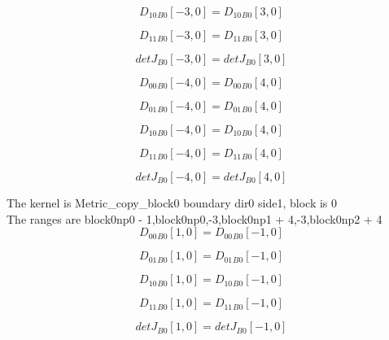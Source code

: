 \documentclass{article}
\begin{document}
\begin{dmath}{D_{10}{_{B0}}}[{-3,0}] = {D_{10}{_{B0}}}[{3,0}]\end{dmath}

\begin{dmath}{D_{11}{_{B0}}}[{-3,0}] = {D_{11}{_{B0}}}[{3,0}]\end{dmath}

\begin{dmath}{detJ{_{B0}}}[{-3,0}] = {detJ{_{B0}}}[{3,0}]\end{dmath}

\begin{dmath}{D_{00}{_{B0}}}[{-4,0}] = {D_{00}{_{B0}}}[{4,0}]\end{dmath}

\begin{dmath}{D_{01}{_{B0}}}[{-4,0}] = {D_{01}{_{B0}}}[{4,0}]\end{dmath}

\begin{dmath}{D_{10}{_{B0}}}[{-4,0}] = {D_{10}{_{B0}}}[{4,0}]\end{dmath}

\begin{dmath}{D_{11}{_{B0}}}[{-4,0}] = {D_{11}{_{B0}}}[{4,0}]\end{dmath}

\begin{dmath}{detJ{_{B0}}}[{-4,0}] = {detJ{_{B0}}}[{4,0}]\end{dmath}

\noindent The kernel is Metric_copy_block0 boundary dir0 side1, block is 0\\\noindent The ranges are block0np0 - 1,block0np0,-3,block0np1 + 4,-3,block0np2 + 4\\\begin{dmath}{D_{00}{_{B0}}}[{1,0}] = {D_{00}{_{B0}}}[{-1,0}]\end{dmath}

\begin{dmath}{D_{01}{_{B0}}}[{1,0}] = {D_{01}{_{B0}}}[{-1,0}]\end{dmath}

\begin{dmath}{D_{10}{_{B0}}}[{1,0}] = {D_{10}{_{B0}}}[{-1,0}]\end{dmath}

\begin{dmath}{D_{11}{_{B0}}}[{1,0}] = {D_{11}{_{B0}}}[{-1,0}]\end{dmath}

\begin{dmath}{detJ{_{B0}}}[{1,0}] = {detJ{_{B0}}}[{-1,0}]\end{dmath}
\end{document}
